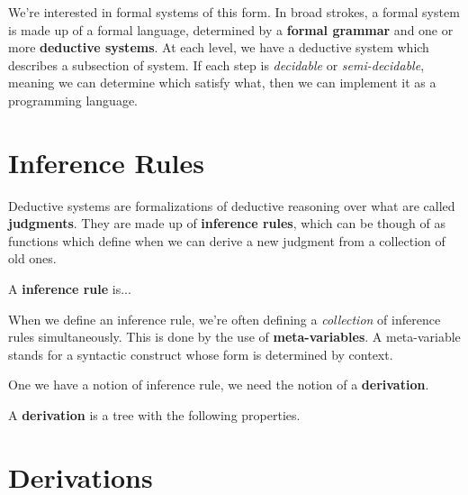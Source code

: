 We're interested in formal systems of this form.  In broad strokes, a formal system is made up of a formal language, determined by a \textbf{formal grammar} and one or more \textbf{deductive systems}.
At each level, we have a deductive system which describes a subsection of system.
If each step is \textit{decidable} or \textit{semi-decidable}, meaning we can determine which satisfy what, then we can implement it as a programming language.

\section{Inference Rules}

Deductive systems are formalizations of deductive reasoning over what are called \textbf{judgments}.
They are made up of \textbf{inference rules}, which can be though of as functions which define when we can derive a new judgment from a collection of old ones.

\begin{definition}
  A \textbf{inference rule} is...
\end{definition}

\begin{example}

\end{example}

When we define an inference rule, we're often defining a \textit{collection} of inference rules simultaneously.
This is done by the use of \textbf{meta-variables}.
A meta-variable stands for a syntactic construct whose form is determined by context.

One we have a notion of inference rule, we need the notion of a \textbf{derivation}.

\begin{definition}
A \textbf{derivation} is a tree with the following properties.
\end{definition}

\section{Derivations}
